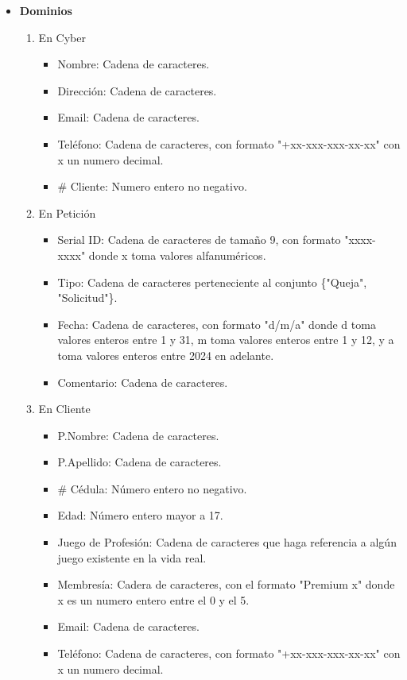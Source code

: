 \documentclass[a4paper,12pt]{article}
\begin{document}
\begin{itemize}
\begin{enumerate}
$ev.Requerimiento.\#\_Miembro\_por\_equipo.\#\_Min\_Miembro$

$\leq (\sum c |CLIENTE(c) \land SE\_INSCRIBE(c, eq) : 1)\leq$

$ev.Requerimiento.\#\_Miembro\_por\_equipo.\#\_Max\_Miembro)$
\end{enumerate}

$\\ \\ \\ \\ \\ \\ $
\item \textbf{Dominios}
\begin{enumerate}
\item En Cyber
\begin{itemize}
\item Nombre: Cadena de caracteres. 
\item Dirección: Cadena de caracteres.
\item Email: Cadena de caracteres.
\item Teléfono: Cadena de caracteres, con formato "+xx-xxx-xxx-xx-xx" con x un numero decimal.
\item $\#$ Cliente: Numero entero no negativo.
\end{itemize}

\item En Petición
\begin{itemize}
\item Serial ID: Cadena de caracteres de tamaño 9, con formato "xxxx-xxxx" donde x toma valores alfanuméricos.
\item Tipo: Cadena de caracteres perteneciente al conjunto \{"Queja", "Solicitud"\}.
\item Fecha: Cadena de caracteres, con formato "d/m/a" donde d toma valores enteros entre 1 y 31, m toma valores enteros entre 1 y 12, y a toma valores enteros entre 2024 en adelante.
\item Comentario: Cadena de caracteres.
\end{itemize}

\item En Cliente
\begin{itemize}
\item P.Nombre: Cadena de caracteres.
\item P.Apellido: Cadena de caracteres.
\item $\#$ Cédula: Número entero no negativo.
\item Edad: Número entero mayor a 17.
\item Juego de Profesión: Cadena de caracteres que haga referencia a algún juego existente en la vida real.
\item Membresía: Cadera de caracteres, con el formato "Premium x" donde x es un numero entero entre el 0 y el 5.
\item Email: Cadena de caracteres.
\item Teléfono: Cadena de caracteres, con formato "+xx-xxx-xxx-xx-xx" con x un numero decimal.
\end{itemize}


\end{enumerate}
\end{itemize}
\end{document}
